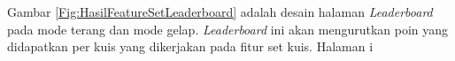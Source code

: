 Gambar \ref*{Fig:HasilFeatureSetLeaderboard} adalah desain halaman \textit{Leaderboard} pada mode terang dan mode gelap.
\textit{Leaderboard} ini akan mengurutkan poin yang didapatkan per kuis yang dikerjakan pada fitur set kuis.
Halaman i